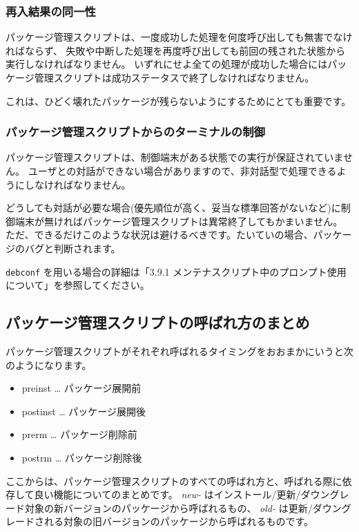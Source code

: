\documentclass[mingoth,a4paper]{jsarticle}
\begin{document}
\subsubsection{再入結果の同一性}
パッケージ管理スクリプトは、一度成功した処理を何度呼び出しても無害でなければならず、
失敗や中断した処理を再度呼び出しても前回の残された状態から実行しなければなりません。
いずれにせよ全ての処理が成功した場合にはパッケージ管理スクリプトは成功ステータスで終了しなければなりません。

これは、ひどく壊れたパッケージが残らないようにするためにとても重要です。

\subsubsection{パッケージ管理スクリプトからのターミナルの制御}
パッケージ管理スクリプトは、制御端末がある状態での実行が保証されていません。
ユーザとの対話ができない場合がありますので、非対話型で処理できるようにしなければなりません。

どうしても対話が必要な場合(優先順位が高く、妥当な標準回答がないなど)に制御端末が無ければパッケージ管理スクリプトは異常終了してもかまいません。
ただ、できるだけこのような状況は避けるべきです。たいていの場合、パッケージのバグと判断されます。

{\tt debconf} を用いる場合の詳細は「3.9.1 メンテナスクリプト中のプロンプト使用について」を参照してください。


\subsection{パッケージ管理スクリプトの呼ばれ方のまとめ}
パッケージ管理スクリプトがそれぞれ呼ばれるタイミングをおおまかにいうと次のようになります。

\begin{itemize}
\item preinst  … パッケージ展開前
\item postinst … パッケージ展開後
\item prerm    … パッケージ削除前
\item postrm   … パッケージ削除後
\end{itemize}

ここからは、パッケージ管理スクリプトのすべての呼ばれ方と、呼ばれる際に依存して良い機能についてのまとめです。
{\it new-} はインストール/更新/ダウングレード対象の新バージョンのパッケージから呼ばれるもの、
{\it old-} は更新/ダウングレードされる対象の旧バージョンのパッケージから呼ばれるものです。
\end{document}
